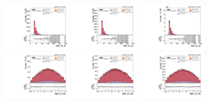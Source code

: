 \begin{figure}[!ht]
  \centering
  \includegraphics[width=0.30\textwidth]{analysis_plots/2016_zjj/cr_vjets_l/dijet_j2_pt.pdf}
  \includegraphics[width=0.30\textwidth]{analysis_plots/2017_zjj/cr_vjets_l/dijet_j2_pt.pdf}
  \includegraphics[width=0.30\textwidth]{analysis_plots/2018_zjj/cr_vjets_l/dijet_j2_pt.pdf} \\
  \includegraphics[width=0.30\textwidth]{analysis_plots/2016_zjj/cr_vjets_l/dijet_j2_eta.pdf}
  \includegraphics[width=0.30\textwidth]{analysis_plots/2017_zjj/cr_vjets_l/dijet_j2_eta.pdf}
  \includegraphics[width=0.30\textwidth]{analysis_plots/2018_zjj/cr_vjets_l/dijet_j2_eta.pdf} \\

\end{figure}
